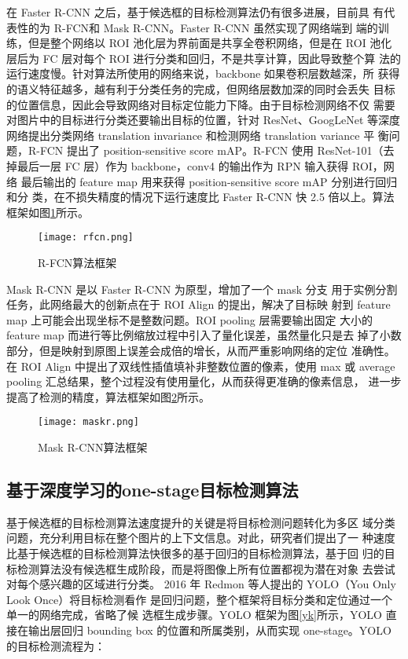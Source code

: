 在 Faster R-CNN 之后，基于候选框的目标检测算法仍有很多进展，目前具
有代表性的为 R-FCN\cite{dai2016r}和 Mask R-CNN\cite{he2017mask}。Faster R-CNN 虽然实现了网络端到
端的训练，但是整个网络以 ROI 池化层为界前面是共享全卷积网络，但是在 ROI
池化层后为 FC 层对每个 ROI 进行分类和回归，不是共享计算，因此导致整个算
法的运行速度慢。针对算法所使用的网络来说，backbone 如果卷积层数越深，所
获得的语义特征越多，越有利于分类任务的完成，但网络层数加深的同时会丢失
目标的位置信息，因此会导致网络对目标定位能力下降。由于目标检测网络不仅
需要对图片中的目标进行分类还要输出目标的位置，针对 ResNet、GoogLeNet
等深度网络提出分类网络 translation invariance 和检测网络 translation variance 平
衡问题，R-FCN 提出了 position-sensitive score mAP。R-FCN 使用 ResNet-101（去
掉最后一层 FC 层）作为 backbone，conv4 的输出作为 RPN 输入获得 ROI，网络
最后输出的 feature map 用来获得 position-sensitive score mAP 分别进行回归和分
类，在不损失精度的情况下运行速度比 Faster R-CNN 快 2.5 倍以上。算法框架如图\ref{rfcn}所示。

\begin{figure}[htbp]
    \centering
    \texttt{[image: rfcn.png]}
    \caption{R-FCN算法框架}
    \label{rfcn}
\end{figure}

Mask R-CNN 是以 Faster R-CNN 为原型，增加了一个 mask 分支
用于实例分割任务，此网络最大的创新点在于 ROI Align 的提出，解决了目标映
射到 feature map 上可能会出现坐标不是整数问题。ROI pooling 层需要输出固定
大小的 feature map 而进行等比例缩放过程中引入了量化误差，虽然量化只是去
掉了小数部分，但是映射到原图上误差会成倍的增长，从而严重影响网络的定位
准确性。在 ROI Align 中提出了双线性插值填补非整数位置的像素，使用 max 或
average pooling 汇总结果，整个过程没有使用量化，从而获得更准确的像素信息，
进一步提高了检测的精度，算法框架如图\ref{maskr}所示。

\begin{figure}[htbp]
    \centering
    \texttt{[image: maskr.png]}
    \caption{Mask R-CNN算法框架}
    \label{maskr}
\end{figure}

\subsection{基于深度学习的one-stage目标检测算法}
基于候选框的目标检测算法速度提升的关键是将目标检测问题转化为多区
域分类问题，充分利用目标在整个图片的上下文信息。对此，研究者们提出了一
种速度比基于候选框的目标检测算法快很多的基于回归的目标检测算法，基于回
归的目标检测算法没有候选框生成阶段，而是将图像上所有位置都视为潜在对象
去尝试对每个感兴趣的区域进行分类\cite{jiao2019survey,wu2020recent}。
2016 年 Redmon 等人提出的 YOLO（You Only Look Once）将目标检测看作
是回归问题\cite{redmon2016you}，整个框架将目标分类和定位通过一个单一的网络完成，省略了候
选框生成步骤。YOLO 框架为图\ref{yk}所示，YOLO 直接在输出层回归 bounding box
的位置和所属类别，从而实现 one-stage。YOLO 的目标检测流程为：

